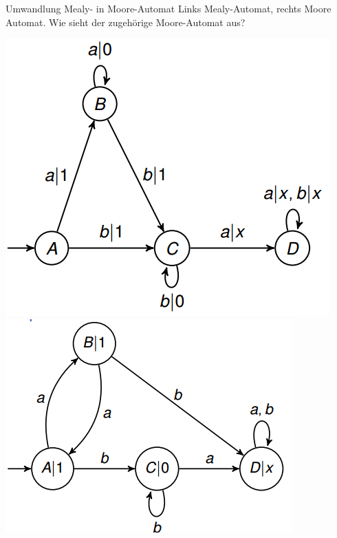 \begin{frame}{Umwandlung Mealy- in Moore-Automat}
	\ifdefined\compiletype
	Links Mealy-Automat, rechts Moore Automat.
	\else
	Wie sieht der zugehörige Moore-Automat aus?
	\fi
	
	\includegraphics[scale=0.5]{images/MealyBsp.png} \pause
	\includegraphics[scale=0.5]{images/MooreBsp.png}
\end{frame}


